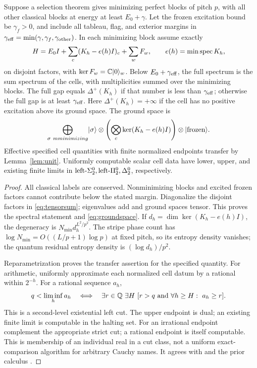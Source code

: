\begin{proposition}\label{prop:transfer}
Suppose a selection theorem gives minimizing perfect blocks of pitch
$p$, with all other classical blocks at energy at least $E_0+\gamma$.
Let the frozen excitation bound be $\gamma_f>0$, and include all
tableau, flag, and exterior margins in
$\gamma_{\rm eff}=\min(\gamma,\gamma_f,\gamma_{\rm other})$.
In each minimizing block assume exactly
\begin{equation}\label{eq:tensorsum}
 H=E_0I+\sum_c(K_h-e(h)I)_c+\sum_w F_w,
 \qquad e(h)=\min\operatorname{spec} K_h,
\end{equation}
on disjoint factors, with $\ker F_w=\mathbb C\lvert0\rangle_w$.
Below $E_0+\gamma_{\rm eff}$, the full spectrum is the sum spectrum
of the cells, with multiplicities summed over the minimizing blocks.
The full gap equals $\Delta^+(K_h)$ if that number is less than
$\gamma_{\rm eff}$; otherwise the full gap is at least
$\gamma_{\rm eff}$. Here $\Delta^+(K_h)=+\infty$ if the cell has
no positive excitation above its ground space.
The ground space is
\begin{equation}\label{eq:groundspace}
 \bigoplus_{\sigma\ {
m minimizing}}\lvert\sigma\rangle\otimes
       \left(\bigotimes_c\ker(K_h-e(h)I)\right)\otimes\lvert\rm frozen\rangle.
\end{equation}
Effective specified cell quantities with finite normalized endpoints
transfer by Lemma~\ref{lem:unit}. Uniformly computable scalar cell data
have lower, upper, and existing finite limits in
$\text{left-}\Sigma^0_2,\text{left-}\Pi^0_2,\Delta^0_2$, respectively.
\end{proposition}
\begin{proof}
All classical labels are conserved. Nonminimizing blocks and excited
frozen factors cannot contribute below the stated margin. Diagonalize
the disjoint factors in \eqref{eq:tensorsum}; eigenvalues add and
ground spaces tensor. This proves the spectral statement and
\eqref{eq:groundspace}. If $d_h=\dim\ker(K_h-e(h)I)$, the degeneracy
is $N_{\min}d_h^{L^2/p^2}$. The stripe phase count has
$\log N_{\min}=O((L/p+1)\log p)$ at fixed pitch, so its entropy density
vanishes; the quantum residual entropy density is $(\log d_h)/p^2$.

Reparametrization proves the transfer assertion for the specified
quantity. For arithmetic, uniformly approximate each normalized cell
datum by a rational within $2^{-h}$. For a rational sequence $a_h$,
\[
 q<\liminf_h a_h\quad\Longleftrightarrow\quad
 \exists r\in\Q\ \exists H\ [r>q\ \text{and}\ \forall h\geq H:\ a_h\geq r].
\]
This is a second-level existential left cut. The upper endpoint is
dual; an existing finite limit is computable in the halting set.
For an irrational endpoint complement the appropriate strict cut;
a rational endpoint is itself computable. This is membership of an
individual real in a cut class, not a uniform exact-comparison
algorithm for arbitrary Cauchy names. It agrees with
\cite[Proposition 10.1]{gap} and the prior calculus \cite{zheng}.
\end{proof}

